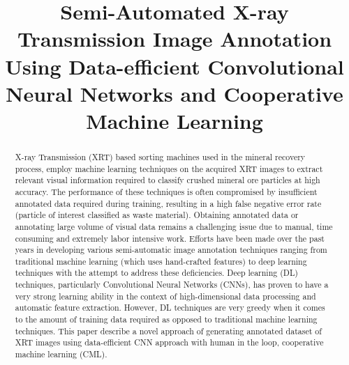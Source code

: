 \documentclass[conference]{IEEEtran}
\begin{document}
\title{Semi-Automated X-ray Transmission Image Annotation Using Data-efficient Convolutional Neural Networks and
 Cooperative Machine Learning\\
}

\author{
\and
{}
\and
{}

}

\maketitle

\begin{abstract}
X-ray Transmission (XRT) based sorting machines used in the mineral recovery process, employ machine
learning techniques on the acquired XRT images to extract relevant visual information required to classify
crushed mineral ore particles at high accuracy. The performance of these techniques is often compromised
by insufficient annotated data required during training, resulting in a high false negative error rate
(particle of interest classified as waste material). Obtaining annotated data or annotating large
volume of visual data remains a challenging issue due to manual, time consuming and extremely labor
intensive work. Efforts have been made over the past years in developing various semi-automatic image
annotation techniques ranging from traditional machine learning (which uses hand-crafted features) to
deep learning techniques with the attempt to address these deficiencies. Deep learning (DL) techniques,
particularly Convolutional Neural Networks (CNNs), has proven to have a very strong learning ability in
the context of high-dimensional data processing and automatic feature extraction. However, DL techniques
are very greedy when it comes to the amount of training data required as opposed to traditional machine
learning techniques. This paper describe a novel approach of generating
 annotated dataset of XRT images using data-efficient CNN approach with human in the loop, cooperative
machine learning (CML). 

\end{abstract}
\end{document}

